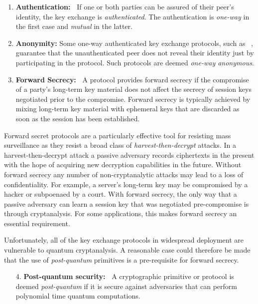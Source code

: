 \documentclass[USenglish,oneside,twocolumn]{article}
\theoremstyle{dgthm}
\theoremstyle{dgdef}
\newcommand{\ntor}{{\sf {ntor}}}
\begin{document}
  \begin{enumerate}
    \item {\bf Authentication:~} If one or both parties can be assured of their
      peer's identity, the key exchange is \emph{authenticated}. The
      authentication is \emph{one-way} in the first case and \emph{mutual} in
      the latter.

    \item {\bf Anonymity:} Some one-way authenticated key exchange protocols,
      such as \ntor~\cite{GoldbergSU13}, guarantee that the unauthenticated peer does not
      reveal their identity just by participating in the protocol. Such protocols
      are deemed \emph{one-way anonymous}.

    \item {\bf Forward Secrecy:~} A protocol provides forward secrecy if the
      compromise of a party's long-term key material does not affect the
      secrecy of session keys negotiated prior to the compromise. Forward secrecy is
      typically achieved by mixing long-term key material with ephemeral keys
      that are discarded as soon as the session has been established.
  \end{enumerate}

  \noindent Forward secret protocols are a particularly effective tool for resisting mass
  surveillance as they resist a broad class of \emph{harvest-then-decrypt}
  attacks. In a harvest-then-decrypt attack a passive adversary records
  ciphertexts in the present with the hope of acquiring new decryption
  capabilities in the future.  Without forward secrecy any number of
  non-cryptanalytic attacks may lead to a loss of confidentiality. For example,
  a server's long-term key may be compromised by a hacker or subpoenaed by a
  court. With forward secrecy, the only way that a passive adversary can learn
  a session key that was negotiated pre-compromise is through cryptanalysis.
  For some applications, this makes forward secrecy an essential requirement.

  Unfortunately, all of the key exchange protocols in widespread deployment are
  vulnerable to quantum cryptanalysis. A reasonable case could therefore be
  made that the use of \emph{post-quantum} primitives is a pre-requisite for forward
  secrecy.

  \begin{enumerate}
    \item[4.] {\bf Post-quantum security:~} A cryptographic primitive or protocol
      is deemed \emph{post-quantum} if it is secure against adversaries that
      can perform polynomial time quantum computations.
  \end{enumerate}
\end{document}
